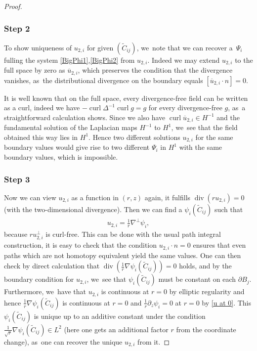 \documentclass[JEP,XML,SOM,Unicode,published]{cedram}
\theoremstyle{definition}
\renewcommand{\div}{\operatorname{div}}
\DeclareMathOperator{\curl}{curl}
\newcommand\eq{=}
\let\de\partial
\begin{document}
\begin{proof}
\subsubsection*{Step 2} To show uniqueness of $u_{2,i}$ for given $(\tilde{C}_{ij})$, we~note that we can recover a~$\Psi_i$ fulling the system \eqref{BigPhi1},\eqref{BigPhi2} from $u_{2,i}$. Indeed we may extend $u_{2,i}$ to the full space by zero as $\overline{u}_{2,i}$, which preserves the condition that the divergence vanishes, as~the distributional divergence on the boundary equals $[\overline{u}_{2,i}\cdot n]=0$.

It is well known that on the full space, every divergence-free field can be written as a curl, indeed we have $-\curl\Delta^{-1}\curl g=g$ for every divergence-free $g$, as~a straightforward calculation shows.
Since we also have $\curl \overline{u}_{2,i}\in H^{-1}$ and the fundamental solution of the Laplacian maps $H^{-1}$ to $H^{1}$, we~see that the field obtained this way lies in $H^1$.
Hence two different solutions $u_{2,i}$ for the same boundary values would give rise to two different $\Psi_i$ in $H^1$ with the same boundary values, which is impossible.

\subsubsection*{Step 3} Now we can view $u_{2,i}$ as a function in $(r,z)$ again, it fulfills $\div(ru_{2,i})=0$ (with the two-dimensional divergence). Then we can find a $\psi_i(\tilde{C}_{ij})$ such that
\begin{align*}
u_{2,i}\eq\frac{1}{r}\nabla^\perp\psi_i,
\end{align*}
because $ru_{2,i}^\perp$ is curl-free. This can be done with the usual path integral construction, it is easy to check that the condition $u_{2,i}\cdot n=0$ ensures that even paths which are not homotopy equivalent yield the same values. One can then check by direct calculation that $\div(\frac{1}{r}\nabla\psi_i(\tilde{C}_{ij}))=0$ holds, and by the boundary condition for $u_{2,i}$, we~see that $\psi_i(\tilde{C}_{ij})$ must be constant on each $\de B_j$. Furthermore, we~have that $u_{2,i}$ is continuous at $r=0$ by elliptic regularity and hence $\frac{1}{r}\nabla\psi_i(\tilde{C}_{ij})$ is continuous at $r=0$ and $\frac{1}{r}\de_z\psi_i=0$ at $r=0$ by \eqref{u at 0}.
This $\psi_i(\tilde{C}_{ij})$ is unique up to an additive constant under the condition $\frac{1}{\sqrt{r}}\nabla\psi_i(\tilde{C}_{ij})\in L^2$ (here one gets an additional factor $r$ from the coordinate change), as~one can recover the unique $u_{2,i}$ from it.


\end{proof}
\end{document}
